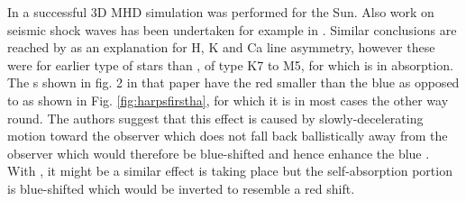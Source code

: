 
In \citet{leenaarts12} a successful 3D MHD simulation was performed for the Sun. Also work on seismic shock waves has
been undertaken for example in \citet{donea06}. Similar conclusions are reached by \citet{rauscher06} as an explanation
for H, K and Ca line asymmetry, however these were for earlier type of stars than \prox, of type K7 to M5, for which
{\ha} is in absorption. The \horn s shown in fig. 2 in that paper have the red {\horn} smaller than the blue {\horn} as
opposed to {\prox} as shown in Fig. \ref{fig:harpsfirstha}, for which it is in most cases the other way round. The
authors suggest that this effect is caused by slowly-decelerating motion toward the observer which does not fall back
ballistically away from the observer which would therefore be blue-shifted and hence enhance the blue \horn. With \prox,
it might be a similar effect is taking place but the self-absorption portion is blue-shifted which would be inverted to
resemble a red shift.

